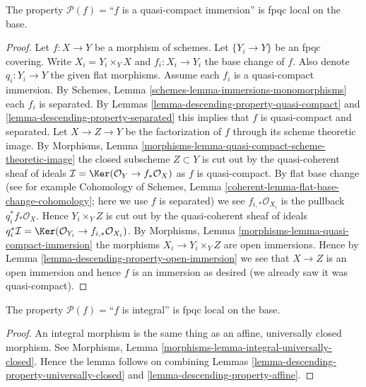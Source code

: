 \begin{lemma}
\label{lemma-descending-property-quasi-compact-immersion}
The property $\mathcal{P}(f) =$``$f$ is a quasi-compact immersion''
is fpqc local on the base.
\end{lemma}

\begin{proof}
Let $f : X \to Y$ be a morphism of schemes.
Let $\{Y_i \to Y\}$ be an fpqc covering.
Write $X_i = Y_i \times_Y X$ and $f_i : X_i \to Y_i$
the base change of $f$. Also denote
$q_i : Y_i \to Y$ the given flat morphisms.
Assume each $f_i$ is a quasi-compact immersion.
By Schemes, Lemma \ref{schemes-lemma-immersions-monomorphisms}
each $f_i$ is separated.
By Lemmas \ref{lemma-descending-property-quasi-compact} and
\ref{lemma-descending-property-separated}
this implies that $f$ is quasi-compact and separated.
Let $X \to Z \to Y$ be the factorization of $f$ through its
scheme theoretic image. By
Morphisms, Lemma \ref{morphisms-lemma-quasi-compact-scheme-theoretic-image}
the closed subscheme $Z \subset Y$ is cut out by the
quasi-coherent sheaf of ideals
$\mathcal{I} = \Ker(\mathcal{O}_Y \to f_*\mathcal{O}_X)$
as $f$ is quasi-compact. By flat base change
(see for example
Cohomology of Schemes, Lemma \ref{coherent-lemma-flat-base-change-cohomology};
here we use $f$ is separated)
we see $f_{i, *}\mathcal{O}_{X_i}$ is the pullback $q_i^*f_*\mathcal{O}_X$.
Hence $Y_i \times_Y Z$ is cut out by the
quasi-coherent sheaf of ideals $q_i^*\mathcal{I} =
\Ker(\mathcal{O}_{Y_i} \to f_{i, *}\mathcal{O}_{X_i})$.
By Morphisms, Lemma \ref{morphisms-lemma-quasi-compact-immersion}
the morphisms $X_i \to Y_i \times_Y Z$
are open immersions. Hence by
Lemma \ref{lemma-descending-property-open-immersion}
we see that $X \to Z$ is an open immersion and
hence $f$ is an immersion as desired
(we already saw it was quasi-compact).
\end{proof}

\begin{lemma}
\label{lemma-descending-property-integral}
The property $\mathcal{P}(f) =$``$f$ is integral''
is fpqc local on the base.
\end{lemma}

\begin{proof}
An integral morphism is the same thing as an affine,
universally closed morphism. See
Morphisms, Lemma \ref{morphisms-lemma-integral-universally-closed}.
Hence the lemma follows on combining
Lemmas \ref{lemma-descending-property-universally-closed}
and \ref{lemma-descending-property-affine}.
\end{proof}

